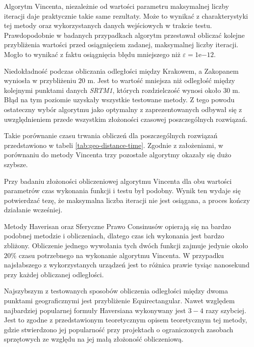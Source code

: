 \par

Algorytm Vincenta, niezależnie od wartości parametru maksymalnej liczby iteracji daje praktycznie takie same rezultaty. Może to wynikać z charakterystyki tej metody oraz wykorzystanych danych wejściowych w trakcie testu. Prawdopodobnie w badanych przypadkach algorytm przestawał obliczać kolejne przybliżenia wartości przed osiągnięciem zadanej, maksymalnej liczby iteracji. Mogło to wynikać z faktu osiągnięcia błędu mniejszego niż $\varepsilon=1\mathrm{e}{-12}$.

\par

Niedokładność podczas obliczania odległości między Krakowem, a Zakopanem wyniosła w przybliżeniu $20$ m. Jest to wartość mniejsza niż odległość między kolejnymi punktami danych \textit{SRTM1}, których rozdzielczość wynosi około $30$ m. Błąd na tym poziomie uzyskały wszystkie testowane metody. Z tego powodu ostateczny wybór algorytmu jako optymalny z zaprezentowanych odbywał się z uwzględnieniem przede wszystkim złożoności czasowej poszczególnych rozwiązań.

Takie porównanie czasu trwania obliczeń dla poszczególnych rozwiązań przedstawiono w tabeli \ref{tab:geo-distance-time}. Zgodnie z założeniami, w porównaniu do metody Vincenta trzy pozostałe algorytmy okazały się dużo szybsze.




Przy badaniu złożoności obliczeniowej algorytmu Vincenta dla obu wartości parametrów czas wykonania funkcji i testu był podobny. Wynik ten wydaje się potwierdzać tezę, że maksymalna liczba iteracji nie jest osiągana, a proces kończy działanie wcześniej. 

\par

Metody Haverisan oraz Sferyczne Prawo Consinusów opierają się na bardzo podobnej metodzie i obliczeniach, dlatego czas ich wykonania jest bardzo zbliżony. Obliczenie jednego wywołania tych dwóch funkcji zajmuje jedynie około $20\%$ czasu potrzebnego na wykonanie algorytmu Vincenta. W przypadku najsłabszego z wykorzystanych urządzeń jest to różnica prawie tysiąc nanosekund przy każdej obliczanej odległości.

\par

Najszybszym z testowanych sposobów obliczenia odległości między dwoma punktami geograficznymi jest przybliżenie Equirectangular. Nawet względem najbardziej popularnej formuły Haversiana wykonywany jest $3-4$ razy szybciej. Jest to zgodne z przedstawionym teoretycznym opisem teoretycznym tej metody, gdzie stwierdzono jej popularność przy projektach o ograniczonych zasobach sprzętowych ze względu na jej małą złożoność obliczeniową.



